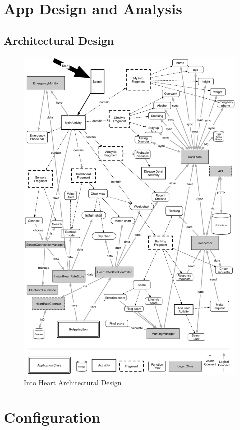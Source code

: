 \documentclass[10pt,a4paper,final]{scrartcl}
\begin{document}
\section{App Design and Analysis}
\subsection{Architectural Design}
\begin{figure}[H]
\centering
\includegraphics[width=5.3in]{img/arch.eps}
\caption{Into Heart Architectural Design}
\end{figure}

\section{Configuration}
\end{document}
